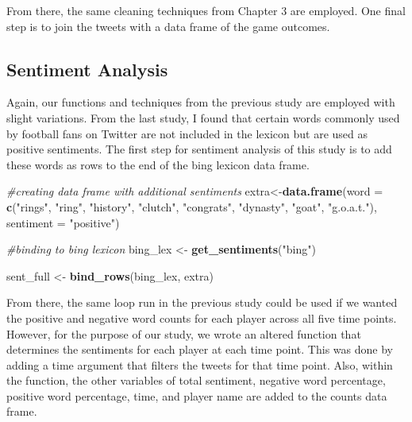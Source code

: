 \documentclass[12pt,twoside]{reedthesis}
\newenvironment{Shaded}{\begin{snugshade}}{\end{snugshade}}
\newcommand{\KeywordTok}[1]{\textcolor[rgb]{0.13,0.29,0.53}{\textbf{#1}}}
\newcommand{\DataTypeTok}[1]{\textcolor[rgb]{0.13,0.29,0.53}{#1}}
\newcommand{\StringTok}[1]{\textcolor[rgb]{0.31,0.60,0.02}{#1}}
\newcommand{\CommentTok}[1]{\textcolor[rgb]{0.56,0.35,0.01}{\textit{#1}}}
\newcommand{\OperatorTok}[1]{\textcolor[rgb]{0.81,0.36,0.00}{\textbf{#1}}}
\newcommand{\NormalTok}[1]{#1}
\begin{document}
From there, the same cleaning techniques from Chapter 3 are employed.
One final step is to join the tweets with a data frame of the game
outcomes.

\small
\begin{Shaded}
\end{Shaded}
\normalsize

\subsection{Sentiment Analysis}\label{sentiment-analysis-1}

Again, our functions and techniques from the previous study are employed
with slight variations. From the last study, I found that certain words
commonly used by football fans on Twitter are not included in the
lexicon but are used as positive sentiments. The first step for
sentiment analysis of this study is to add these words as rows to the
end of the bing lexicon data frame.

\small
\begin{Shaded}
\begin{Highlighting}[]
\CommentTok{#creating data frame with additional sentiments}
\NormalTok{extra<-}\KeywordTok{data.frame}\NormalTok{(}\DataTypeTok{word =} \KeywordTok{c}\NormalTok{(}\StringTok{"rings"}\NormalTok{, }\StringTok{"ring"}\NormalTok{, }\StringTok{"history"}\NormalTok{, }\StringTok{"clutch"}\NormalTok{, }
                    \StringTok{"congrats"}\NormalTok{, }\StringTok{"dynasty"}\NormalTok{, }\StringTok{"goat"}\NormalTok{, }\StringTok{"g.o.a.t."}\NormalTok{), }
               \DataTypeTok{sentiment =} \StringTok{"positive"}\NormalTok{)}

\CommentTok{#binding to bing lexicon}
\NormalTok{bing_lex <-}\StringTok{ }\KeywordTok{get_sentiments}\NormalTok{(}\StringTok{"bing"}\NormalTok{)}

\NormalTok{sent_full <-}\StringTok{ }\KeywordTok{bind_rows}\NormalTok{(bing_lex, extra)}
\end{Highlighting}
\end{Shaded}
\normalsize

From there, the same loop run in the previous study could be used if we
wanted the positive and negative word counts for each player across all
five time points. However, for the purpose of our study, we wrote an
altered function that determines the sentiments for each player at each
time point. This was done by adding a time argument that filters the
tweets for that time point. Also, within the function, the other
variables of total sentiment, negative word percentage, positive word
percentage, time, and player name are added to the counts data frame.
\end{document}
